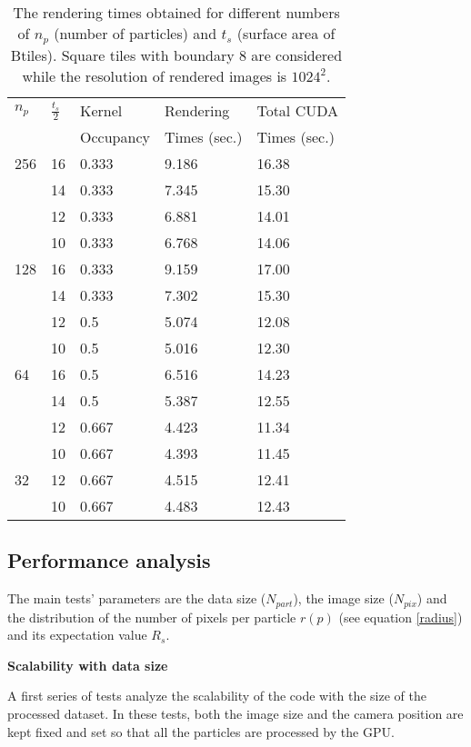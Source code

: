 \documentclass[1p]{elsarticle}
\begin{document}
\begin{table}
\label{tab:tuning}
\begin{center}
\begin{tabular}{|l|l|l|l|l|}
\hline
$n_p$ & $\frac{t_s}{2}$ & Kernel & Rendering & Total CUDA \\
& & Occupancy & Times (sec.) & Times (sec.) \\
\hline
256   & 16 & 0.333 & 9.186 & 16.38 \\
\hline
      & 14 & 0.333 & 7.345  & 15.30 \\
\hline
      & 12 & 0.333 & 6.881  & 14.01 \\
\hline
      & 10 & 0.333 & 6.768 & 14.06 \\
\hline
128   & 16 & 0.333 & 9.159 & 17.00 \\
\hline
      & 14 & 0.333 & 7.302  & 15.30 \\
\hline
      & 12 & 0.5 & 5.074  & 12.08 \\
\hline
      & 10 & 0.5 & 5.016 & 12.30 \\ 
\hline
64    & 16 & 0.5 & 6.516 & 14.23 \\
\hline
      & 14 & 0.5 & 5.387 & 12.55 \\
\hline
      & 12 & 0.667 & 4.423 & 11.34 \\
\hline
      & 10 & 0.667 & 4.393 & 11.45 \\ 
\hline
32    & 12 & 0.667 & 4.515 & 12.41 \\
\hline
      & 10 & 0.667 & 4.483 & 12.43 \\ 
\hline
\end{tabular}
\caption{The rendering times obtained for different numbers of $n_p$ (number of particles) and $t_s$ (surface area of Btiles). Square tiles with boundary 8 are considered while the resolution of rendered images is $1024^{2}.$}
\end{center}
\end{table}

\subsection{Performance analysis}
\label{sec:performance}
The main tests' parameters are the data size ($N_{part}$), the image size ($N_{pix}$)
and the distribution of the number of pixels 
per particle $r(p)$ (see equation \eqref{radius}) and its expectation value $R_s$.

\medskip
\noindent 
{\bf Scalability with data size}

\noindent
A first series of tests analyze the scalability of the code
with the size of the processed dataset. In these tests, both the image size
and the camera position are kept fixed and set so that all the particles are processed 
by the GPU.
\end{document}

